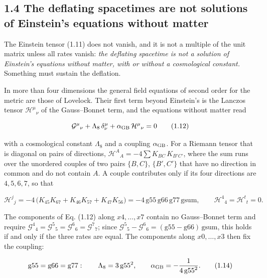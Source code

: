 \documentclass[
  10pt,
]{article}
\begin{document}
\hypertarget{the-deflating-spacetimes-are-not-solutions-of-einsteins-equations-without-matter}{%
\subsection{1.4 The deflating spacetimes are not solutions of Einstein's
equations without
matter}\label{the-deflating-spacetimes-are-not-solutions-of-einsteins-equations-without-matter}}

The Einstein tensor (1.11) does not vanish, and it is not a multiple of
the unit matrix unless all rates vanish: \emph{the deflating spacetime
is not a solution of Einstein's equations without matter, with or
without a cosmological constant.} Something must sustain the deflation.

In more than four dimensions the general field equations of second order
for the metric are those of Lovelock. Their first term beyond Einstein's
is the Lanczos tensor \(\mathcal H^\mu{}_\nu\) of the Gauss--Bonnet
term, and the equations without matter read

\[\mathcal G^\mu{}_\nu+\Lambda_8\,\delta^\mu_\nu+\alpha_{\rm GB}\,\mathcal H^\mu{}_\nu=0\tag{1.12}\]

with a cosmological constant \(\Lambda_8\) and a coupling
\(\alpha_{\rm GB}\). For a Riemann tensor that is diagonal on pairs of
directions, \(\mathcal H^A{}_A=-4\sum K_{BC}\,K_{B'C'}\), where the sum
runs over the unordered couples of two pairs \(\{B,C\}\), \(\{B',C'\}\)
that have no direction in common and do not contain \(A\). A couple
contributes only if its four directions are \(4,5,6,7\), so that

\[\mathcal H^j{}_j=-4\,\big(K_{45}K_{67}+K_{46}K_{57}+K_{47}K_{56}\big)
=-4\,\mathrm{g55}\,\mathrm{g66}\,\mathrm{g77}\,\mathrm{gsum},\qquad
\mathcal H^4{}_4=\mathcal H^t{}_t=0.\tag{1.13}\]

The components of Eq. (1.12) along \(x4,\dots,x7\) contain no
Gauss--Bonnet term and require
\(\mathcal G^4{}_4=\mathcal G^5{}_5=\mathcal G^6{}_6=\mathcal G^7{}_7\);
since
\(\mathcal G^5{}_5-\mathcal G^6{}_6=(\mathrm{g55}-\mathrm{g66})\,\mathrm{gsum}\),
this holds if and only if the three rates are equal. The components
along \(x0,\dots,x3\) then fix the coupling:

\[\mathrm{g55}=\mathrm{g66}=\mathrm{g77}:\qquad\Lambda_8=3\,\mathrm{g55}^2,\qquad
\alpha_{\rm GB}=-\frac{1}{4\,\mathrm{g55}^2}.\tag{1.14}\]
\end{document}
